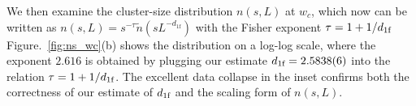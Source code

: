 

We then examine the cluster-size distribution $n(s, L)$ at $w_c$, which now can be written as $n(s, L) = s^{-\tau} \tilde{n}(s L^{-d_{1\textrm{f}}})$ with
the Fisher exponent $\tau = 1 + 1/{d_{1\textrm{f}}}$
Figure.~\ref{fig:ns_wc}(b) shows the distribution on a log-log scale, where the exponent $2.616$ is obtained by plugging our estimate ${d_{1\textrm{f}}}=2.5838(6)$
into the relation $\tau = 1+1/{d_{1\textrm{f}}}$. The excellent data collapse in the inset confirms both the correctness of our estimate of ${d_{1\textrm{f}}}$ and the scaling form of $n(s, L)$.

